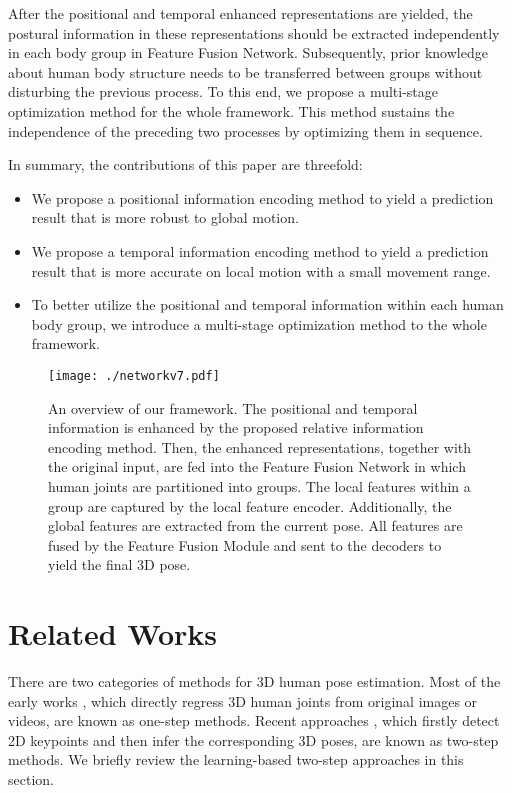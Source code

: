 \documentclass[sigconf]{acmart}
\begin{document}
After the positional and temporal enhanced representations are yielded, the postural information in these representations should be extracted independently in each body group in Feature Fusion Network. Subsequently, prior knowledge about human body structure needs to be transferred between groups without disturbing the previous process. To this end, we propose a multi-stage optimization method for the whole framework. This method sustains the independence of the preceding two processes by optimizing them in sequence.


In summary, the contributions of this paper are threefold:
\begin{itemize}
  \item We propose a positional information encoding method to yield a prediction result that is more robust to global motion.
  \item We propose a temporal information encoding method to yield a prediction result that is more accurate on local motion with a small movement range.
  \item To better utilize the positional and temporal information within each human body group, we introduce a multi-stage optimization method to the whole framework.
\end{itemize}



\begin{figure*}
  \texttt{[image: ./networkv7.pdf]}
  \vspace{-0.4cm}
  \caption{An overview of our framework. The positional and temporal information is enhanced by the proposed relative information encoding method. Then, the enhanced representations, together with the original input, are fed into the Feature Fusion Network in which human joints are partitioned into  groups. The local features within a group are captured by the local feature encoder. Additionally, the global features are extracted from the current pose. All features are fused by the Feature Fusion Module and sent to the decoders to yield the final 3D pose. }
  \vspace{-0.2cm}
  \label{img2}
\end{figure*}



\section{Related Works}
There are two categories of methods for 3D human pose estimation. Most of the early works \cite{pavlakos2017coarse,li20143d,tekin2016structured,rogez2017lcr}, which directly regress 3D human joints from original images or videos, are known as one-step methods. Recent approaches \cite{jllo20193d,martinez2017simple,cai2019exploiting,chen20173d,iqbal2020weakly}, which firstly detect 2D keypoints and then infer the corresponding 3D poses, are known as two-step methods. We briefly review the learning-based two-step approaches in this section.
\end{document}
